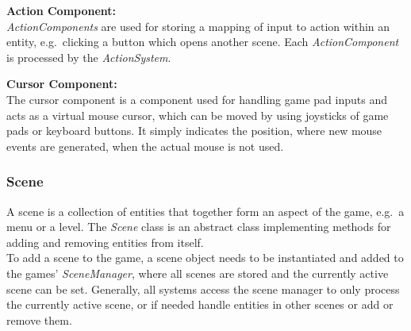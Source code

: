 \textbf{Action Component:} \\
\textit{ActionComponents} are used for storing a mapping of input to action within an entity, e.g.\ clicking a button which opens another scene.
Each \textit{ActionComponent} is processed by the \textit{ActionSystem}.

\textbf{Cursor Component:} \\
The cursor component is a component used for handling game pad inputs and acts as a virtual mouse cursor, which can be moved by using
joysticks of game pads or keyboard buttons.
It simply indicates the position, where new mouse events are generated, when the actual mouse is not used.
\subsubsection{Scene}\label{subsubsec:scene}
A scene is a collection of entities that together form an aspect of the game, e.g.\ a menu or a level.
The \textit{Scene} class is an abstract class implementing methods for adding and removing entities from itself.
\\
To add a scene to the game, a scene object needs to be instantiated and added to the games' \textit{SceneManager}, where all
scenes are stored and the currently active scene can be set.
Generally, all systems access the scene manager to only process the currently active scene, or if needed handle entities in other scenes or add or remove them.
